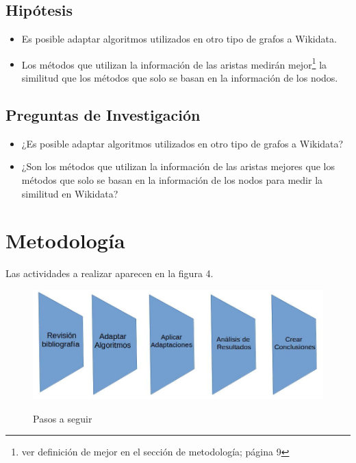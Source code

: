 \subsection{Hipótesis}
\begin{itemize}
\item Es posible adaptar algoritmos utilizados en otro tipo de grafos a Wikidata. 
\item  Los métodos que  utilizan la información de las aristas medirán mejor\footnote{ver definición de mejor en el sección de metodología; página 9} la similitud que los métodos que solo se basan en la información de los nodos. 
\end{itemize}
\subsection{Preguntas de Investigación}
\begin{itemize}
\item ¿Es posible adaptar algoritmos utilizados en otro tipo de grafos a Wikidata?
\item ¿Son los métodos que  utilizan la información de las aristas mejores que los métodos que solo se basan en la información de los nodos para medir la similitud en Wikidata?
\end{itemize}

\section{Metodología}
Las actividades a realizar aparecen en la figura 4. 
 \begin{figure}[h]
 \centering 
\includegraphics[scale=0.3]{esquema2.jpg}
\label{fig:Imagen4 }
\caption{Pasos a seguir}
\end{figure}


